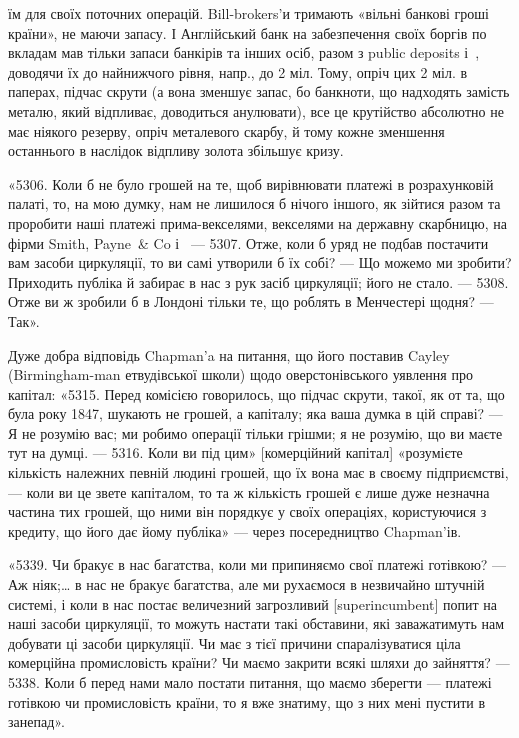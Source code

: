 \parcont{}  %
їм для своїх поточних операцій. Bill-brokers’и тримають «вільні банкові гроші
країни», не маючи запасу. І Англійський банк на забезпечення своїх боргів по
вкладам мав тільки запаси банкірів та інших осіб, разом з public deposits і~,
доводячи їх до найнижчого рівня, напр., до 2 міл. Тому, опріч цих 2 міл. в паперах,
підчас скрути (а вона зменшує запас, бо банкноти, що надходять замість
металю, який відпливає, доводиться анулювати), все це крутійство абсолютно
не має ніякого резерву, опріч металевого скарбу, й тому кожне зменшення останнього
в наслідок відпливу золота збільшує кризу.

«5306. Коли б не було грошей на те, щоб вирівнювати платежі в розрахунковій
палаті, то, на мою думку, нам не лишилося б нічого іншого, як
зійтися разом та проробити наші платежі прима-векселями, векселями на державну
скарбницю, на фірми Smith, Payne~\& Co і~ — 5307. Отже, коли б
уряд не подбав постачити вам засоби циркуляції, то ви самі утворили б їх
собі? — Що можемо ми зробити? Приходить публіка й забирає в нас з рук
засіб циркуляції; його не стало. — 5308. Отже ви ж зробили б в Лондоні тільки
те, що роблять в Менчестері щодня? — Так».

Дуже добра відповідь Chapman’a на питання, що його поставив Cayley
(Birmingham-man етвудівської школи) щодо оверстонівського уявлення про
капітал: «5315. Перед комісією говорилось, що підчас скрути, такої, як от та,
що була року 1847, шукають не грошей, а капіталу; яка ваша думка в цій
справі? — Я не розумію вас; ми робимо операції тільки грішми; я не розумію,
що ви маєте тут на думці. — 5316. Коли ви під цим» [комерційний капітал]
«розумієте кількість належних певній людині грошей, що їх вона має в
своєму підприємстві, — коли ви це звете капіталом, то та ж кількість грошей є
лише дуже незначна частина тих грошей, що ними він порядкує у своїх операціях,
користуючися з кредиту, що його дає йому публіка» — через посередництво
Chapman’ів.

«5339. Чи бракує в нас багатства, коли ми припиняємо свої платежі готівкою?
— Аж ніяк;\dots{} в нас не бракує багатства, але ми рухаємося в незвичайно
штучній системі, і коли в нас постає величезний загрозливий [superincumbent]
попит на наші засоби циркуляції, то можуть настати такі обставини, які
заважатимуть нам добувати ці засоби циркуляції. Чи має з тієї причини спаралізуватися
ціла комерційна промисловість країни? Чи маємо закрити всякі
шляхи до зайняття? — 5338. Коли б перед нами мало постати питання, що
маємо зберегти — платежі готівкою чи промисловість країни, то я вже знатиму,
що з них мені пустити в занепад».

